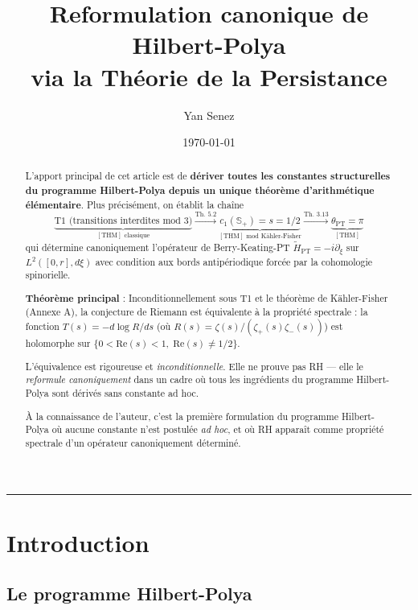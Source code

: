 \documentclass[11pt, a4paper]{article}
\title{Reformulation canonique de Hilbert-Polya \\
       via la Théorie de la Persistance}
\author{Yan Senez}
\date{\today}
\numberwithin{equation}{section}
\begin{document}
\maketitle

\begin{abstract}
L'apport principal de cet article est de \textbf{dériver toutes les constantes
structurelles du programme Hilbert-Polya depuis un unique théorème
d'arithmétique élémentaire}. Plus précisément, on établit la chaîne
\[
  \underbrace{\text{T1 (transitions interdites mod 3)}}_{[\mathrm{THM}]\text{ classique}}
  \xrightarrow{\text{Th. 5.2}}
  \underbrace{c_1(\mathbb{S}_+) = s = 1/2}_{[\mathrm{THM}]\text{ mod Kähler-Fisher}}
  \xrightarrow{\text{Th. 3.13}}
  \underbrace{\theta_{\mathrm{PT}} = \pi}_{[\mathrm{THM}]}
\]
qui détermine canoniquement l'opérateur de Berry-Keating-PT
$\tilde H_{\mathrm{PT}} = -i\partial_\xi$ sur $L^2([0, r], d\xi)$ avec
condition aux bords antipériodique forcée par la cohomologie spinorielle.

\textbf{Théorème principal} : Inconditionnellement sous T1 et le théorème
de Kähler-Fisher (Annexe A), la conjecture de Riemann est équivalente à
la propriété spectrale : la fonction $T(s) = -d\log R/ds$ (où
$R(s) = \zeta(s)/(\zeta_+(s)\zeta_-(s))$) est holomorphe sur
$\{0 < \mathrm{Re}(s) < 1,\; \mathrm{Re}(s) \neq 1/2\}$.

L'équivalence est rigoureuse et \emph{inconditionnelle}. Elle ne prouve pas RH —
elle le \emph{reformule canoniquement} dans un cadre où tous les ingrédients
du programme Hilbert-Polya sont dérivés sans constante ad hoc.

À la connaissance de l'auteur, c'est la première formulation du programme
Hilbert-Polya où aucune constante n'est postulée \emph{ad hoc}, et où RH
apparaît comme propriété spectrale d'un opérateur canoniquement déterminé.
\end{abstract}

\tableofcontents
\bigskip
\hrule
\bigskip

\section{Introduction}
\label{sec:intro}

\subsection{Le programme Hilbert-Polya}
\end{document}
